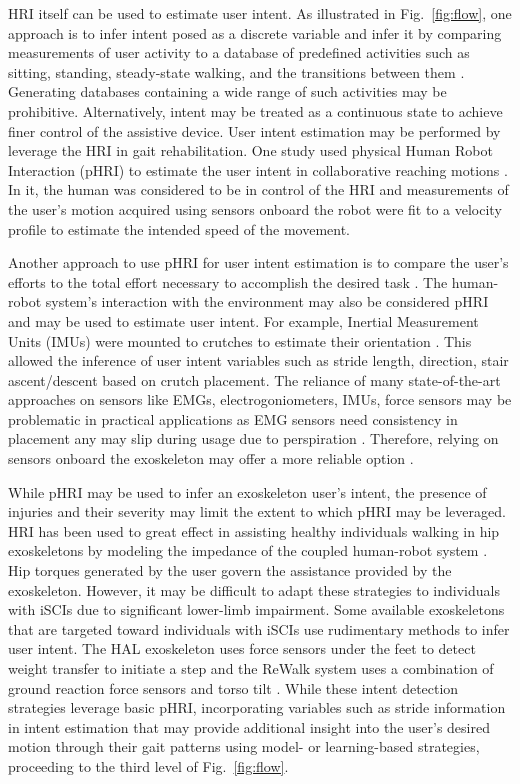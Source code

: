 HRI itself can be used to estimate user intent. As illustrated in Fig.~\ref{fig:flow}, one approach is to infer intent posed as a discrete variable and infer it by comparing measurements of user activity to a database of predefined activities such as sitting, standing, steady-state walking, and the transitions between them \cite{shen2013motion}. Generating databases containing a wide range of such activities may be prohibitive. Alternatively, intent may be treated as a continuous state to achieve finer control of the assistive device. User intent estimation may be performed by leverage the HRI in gait rehabilitation. One study used physical Human Robot Interaction (pHRI) to estimate the user intent in collaborative reaching motions  \cite{corteville2007human}. In it, the human was considered to be in control of the HRI and measurements of the user's motion acquired using sensors onboard the robot were fit to a velocity profile to estimate the intended speed of the movement. 

Another approach to use pHRI for user intent estimation is to compare the user's efforts to the total effort necessary to accomplish the desired task \cite{pehlivan2015minimal}. The human-robot system's interaction with the environment may also be considered pHRI and may be used to estimate user intent. For example, Inertial Measurement Units (IMUs) were mounted to crutches to estimate their orientation \cite{brescianini2011ins}. This allowed the inference of user intent variables such as stride length, direction, stair ascent/descent based on crutch placement. The reliance of many state-of-the-art approaches on sensors like EMGs, electrogoniometers, IMUs, force sensors may be problematic in practical applications as EMG sensors need consistency in placement any may slip during usage due to perspiration \cite{tkach2010study,ison2014role}. Therefore, relying on sensors onboard the exoskeleton may offer a more reliable option \cite{Gambon20b}. 

While pHRI may be used to infer an exoskeleton user's intent, the presence of injuries and their severity may limit the extent to which pHRI may be leveraged. HRI has been used to great effect in assisting healthy individuals walking in hip exoskeletons by modeling the impedance of the coupled human-robot system \cite{zhang2019admittance,nagarajan2016integral}. Hip torques generated by the user govern the assistance provided by the exoskeleton. However, it may be difficult to adapt these strategies to individuals with iSCIs due to significant lower-limb impairment. Some available exoskeletons that are targeted toward individuals with iSCIs use rudimentary methods to infer user intent. The HAL exoskeleton uses force sensors under the feet to detect weight transfer to initiate a step \cite{suzuki2007intention} and the ReWalk system uses a combination of ground reaction force sensors and torso tilt \cite{goffer2012locomotion}. While these intent detection strategies leverage basic pHRI, incorporating variables such as stride information in intent estimation that may provide additional insight into the user's desired motion through their gait patterns using model- or learning-based strategies, proceeding to the third level of Fig.~\ref{fig:flow}.

